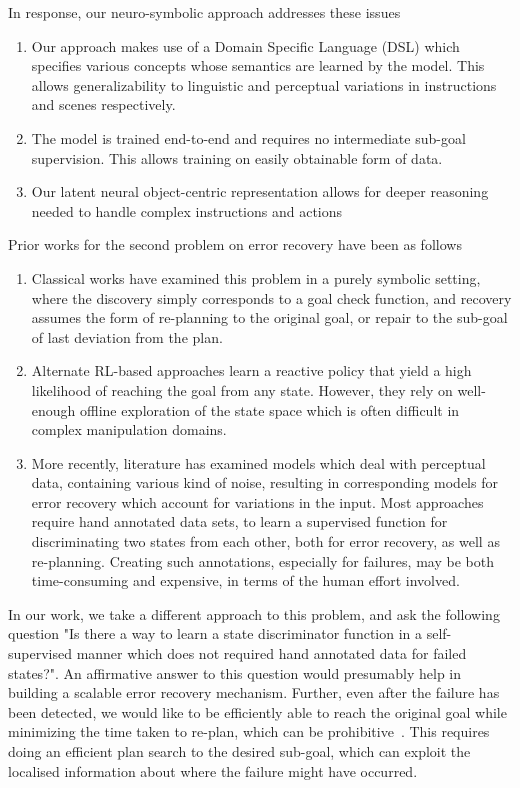 In response, our neuro-symbolic approach addresses these issues
\begin{enumerate}
    \item Our approach makes use of a Domain Specific Language (DSL) which specifies various concepts whose semantics are learned by the model. This allows generalizability to linguistic and perceptual variations in instructions and scenes respectively.
    \item The model is trained end-to-end and requires no intermediate sub-goal supervision. This allows training on easily obtainable form of data.
    \item Our latent neural object-centric representation allows for deeper reasoning needed to handle complex instructions and actions
\end{enumerate}
%

Prior works for the second problem on error recovery have been as follows

\begin{enumerate}
    \item Classical works have examined this problem in a purely symbolic setting, where the discovery simply corresponds to a goal check function, and recovery assumes the form of re-planning to the original goal, or repair to the sub-goal of last deviation from the plan.
    \item Alternate RL-based approaches learn a reactive policy that yield a high likelihood of reaching the goal from any state. However, they rely on well-enough offline exploration of the state space which is often difficult in complex manipulation domains.
    \item  More recently, literature has examined models which deal with perceptual data, containing various kind of noise, resulting in corresponding models for error recovery which account for variations in the input. Most approaches require hand annotated data sets, to learn a supervised function for discriminating two states from each other, both for error recovery, as well as re-planning. Creating such annotations, especially for failures, may be both time-consuming and expensive, in terms of the human effort involved. 
\end{enumerate}

%
In our work, we take a different approach to this problem, and ask the following question "Is there a way to learn a state discriminator function in a self-supervised manner which does not required hand annotated data for failed states?". An affirmative answer to this question would presumably help in building a scalable error recovery mechanism. Further, even after the failure has been detected, we would like to be efficiently able to reach the original goal while minimizing the time taken to re-plan, which can be prohibitive~\cite{fox2006plan}. This requires doing an efficient plan search to the desired sub-goal, which can exploit the localised information about where the failure might have occurred. 

